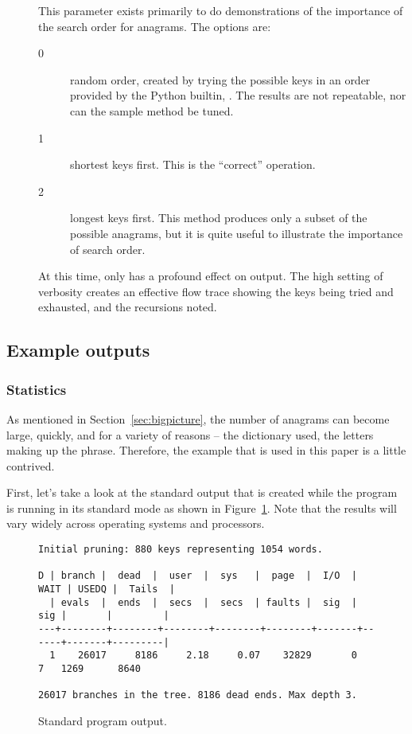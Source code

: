 \documentclass[letterpaper, 11pt]{article}
\begin{document}
\begin{description}
\item[] This parameter exists primarily to do demonstrations
of the importance of the search order for anagrams. The options are:

\begin{description}
\item[0] random order, created by trying the possible keys in 
an order provided by the Python builtin, . The
results are not repeatable, nor can the sample method be tuned.

\item[1] shortest keys first. This is the ``correct''
operation.

\item[2] longest keys first. This method produces only a subset of
the possible anagrams, but it is quite useful to illustrate the
importance of search order.

\end{description}

\item[] At this time, only  has a profound
effect on output. The high setting of verbosity creates an effective
flow trace showing the keys being tried and exhausted, and the
recursions noted.

\end{description}

\subsection{Example outputs}

\subsubsection{Statistics}

As mentioned in Section~\ref{sec:bigpicture}, the number of anagrams
can become large, quickly, and for a variety of reasons -- the
dictionary used, the letters making up the phrase. Therefore, the
example that is used in this paper is a little contrived.

First, let's take a look at the standard output that is created
while the program is running in its standard mode as shown
in Figure~\ref{fig:stdoutput}.  Note that the
results will vary widely across operating systems and processors.

\begin{figure}
\small
\begin{verbatim}
Initial pruning: 880 keys representing 1054 words.

D | branch |  dead  |  user  |  sys   |  page  |  I/O  | WAIT | USEDQ |  Tails  |
  | evals  |  ends  |  secs  |  secs  | faults |  sig  |  sig |       |         |
---+--------+--------+--------+--------+--------+-------+------+-------+---------|
  1    26017     8186     2.18     0.07    32829       0      7   1269      8640

26017 branches in the tree. 8186 dead ends. Max depth 3.
\end{verbatim}
\normalsize
\caption{Standard program output.}
\label{fig:stdoutput}
\end{figure}
\end{document}
